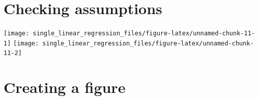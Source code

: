 \documentclass[
]{book}
\newenvironment{Shaded}{\begin{snugshade}}{\end{snugshade}}
\newcommand{\CommentTok}[1]{\textcolor[rgb]{0.56,0.35,0.01}{\textit{#1}}}
\newcommand{\DataTypeTok}[1]{\textcolor[rgb]{0.13,0.29,0.53}{#1}}
\newcommand{\DecValTok}[1]{\textcolor[rgb]{0.00,0.00,0.81}{#1}}
\newcommand{\KeywordTok}[1]{\textcolor[rgb]{0.13,0.29,0.53}{\textbf{#1}}}
\newcommand{\NormalTok}[1]{#1}
\newcommand{\OperatorTok}[1]{\textcolor[rgb]{0.81,0.36,0.00}{\textbf{#1}}}
\begin{document}
\hypertarget{checking-assumptions}{%
\section{Checking assumptions}\label{checking-assumptions}}

\begin{Shaded}
\end{Shaded}

\begin{flushleft}\texttt{[image: single\_linear\_regression\_files/figure-latex/unnamed-chunk-11-1]} \texttt{[image: single\_linear\_regression\_files/figure-latex/unnamed-chunk-11-2]} \end{flushleft}

\hypertarget{creating-a-figure}{%
\section{Creating a figure}\label{creating-a-figure}}
\end{document}
